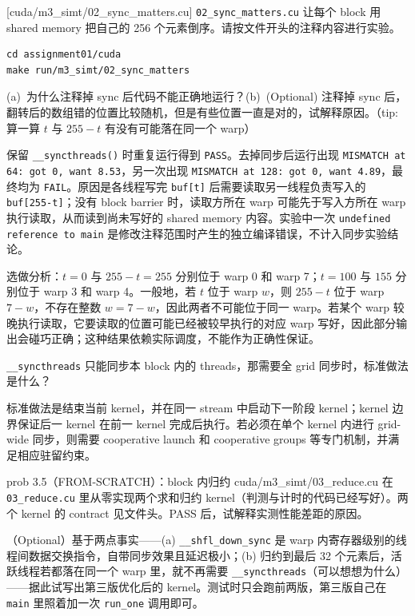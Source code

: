 \documentclass[11pt,a4paper,fontset=none]{ctexart}
\begin{document}
[cuda/m3\_simt/02\_sync\_matters.cu]
\texttt{02\_sync\_matters.cu} 让每个 block 用 shared memory 把自己的 256 个元素倒序。请按文件开头的注释内容进行实验。

\begin{lstlisting}
cd assignment01/cuda
make run/m3_simt/02_sync_matters
\end{lstlisting}

(a)~为什么注释掉 sync 后代码不能正确地运行？(b)~(Optional) 注释掉 sync 后，翻转后的数组错的位置比较随机，但是有些位置一直是对的，试解释原因。（tip: 算一算 $t$ 与 $255-t$ 有没有可能落在同一个 warp）

\begin{tcolorbox}[title={3.3 实验记录与作答}]
保留 \texttt{\_\_syncthreads()} 时重复运行得到 \texttt{PASS}。去掉同步后运行出现 \texttt{MISMATCH at 64: got 0, want 8.53}，另一次出现 \texttt{MISMATCH at 128: got 0, want 4.89}，最终均为 \texttt{FAIL}。原因是各线程写完 \texttt{buf[t]} 后需要读取另一线程负责写入的 \texttt{buf[255-t]}；没有 block barrier 时，读取方所在 warp 可能先于写入方所在 warp 执行读取，从而读到尚未写好的 shared memory 内容。实验中一次 \texttt{undefined reference to main} 是修改注释范围时产生的独立编译错误，不计入同步实验结论。

选做分析：$t=0$ 与 $255-t=255$ 分别位于 warp 0 和 warp 7；$t=100$ 与 $155$ 分别位于 warp 3 和 warp 4。一般地，若 $t$ 位于 warp $w$，则 $255-t$ 位于 warp $7-w$，不存在整数 $w=7-w$，因此两者不可能位于同一 warp。若某个 warp 较晚执行读取，它要读取的位置可能已经被较早执行的对应 warp 写好，因此部分输出会碰巧正确；这种结果依赖实际调度，不能作为正确性保证。
\end{tcolorbox}

\texttt{\_\_syncthreads} 只能同步本 block 内的 threads，那需要全 grid 同步时，标准做法是什么？

\begin{tcolorbox}[title={3.4 作答（复用前述讨论）}]
标准做法是结束当前 kernel，并在同一 stream 中启动下一阶段 kernel；kernel 边界保证后一 kernel 在前一 kernel 完成后执行。若必须在单个 kernel 内进行 grid-wide 同步，则需要 cooperative launch 和 cooperative groups 等专门机制，并满足相应驻留约束。
\end{tcolorbox}

\begin{capstone}{prob 3.5（FROM-SCRATCH）：block 内归约 \hfill {\footnotesize\ttfamily cuda/m3\_simt/03\_reduce.cu}}
在 \texttt{03\_reduce.cu} 里从零实现两个求和归约 kernel（判测与计时的代码已经写好）。两个 kernel 的 contract 见文件头。PASS 后，试解释实测性能差距的原因。

（Optional）基于两点事实——(a) \texttt{\_\_shfl\_down\_sync} 是 warp 内寄存器级别的线程间数据交换指令，自带同步效果且延迟极小；(b) 归约到最后 32 个元素后，活跃线程若都落在同一个 warp 里，就不再需要 \texttt{\_\_syncthreads}（可以想想为什么）——据此试写出第三版优化后的 kernel。测试时只会跑前两版，第三版自己在 \texttt{main} 里照着加一次 \texttt{run\_one} 调用即可。
\end{capstone}
\end{document}
